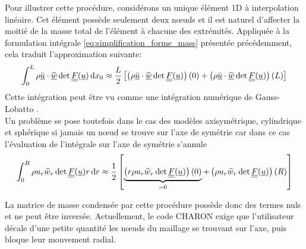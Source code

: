 \documentclass[10pt]{book}
\begin{document}
Pour illustrer cette procédure, considérons un unique élément 1D à interpolation linéaire. Cet élément possède seulement deux nœuds et il est naturel d'affecter la moitié de la masse total de l’élément à chacune des extrémités. Appliquée à la formulation intégrale \eqref{eq:simplification_forme_mass} présentée précédemment, cela traduit l'approximation suivante:
$$\int_{0}^{L}\rho\ddot{\underline{u}}\cdot\widehat{\underline{w}}\det\underline{\underline{F}}(\underline{u})\,\mathrm{d}x_{0}\approx \dfrac{L}{2}\left[\left(\rho\ddot{\underline{u}}\cdot\widehat{\underline{w}}\det\underline{\underline{F}}(\underline{u})\right)(0)+\left(\rho\ddot{\underline{u}}\cdot\widehat{\underline{w}}\det\underline{\underline{F}}(\underline{u})\right)(L)\right]$$
Cette intégration peut être vu comme une intégration numérique de Gauss-Lobatto \cite{durufle2009influence, teukolsky2015short}.\\

Un problème se pose toutefois dans le cas des modèles axisymétrique, cylindrique et sphérique si jamais un nœud se trouve sur l'axe de symétrie car dans ce cas l'évaluation de l'intégrale sur l'axe de symétrie s'annule
$$\int_{0}^{R}\rho u_{r}\widehat{w}_{r}\det\underline{\underline{F}}(\underline{u})r\,\mathrm{d}r\approx \dfrac{1}{2}\left[\underbrace{\left(r\rho u_{r}\widehat{w}_{r}\det\underline{\underline{F}}(\underline{u})\right)(0)}_{=0}+\left(\rho u_{r}\widehat{w}_{r}\det\underline{\underline{F}}(\underline{u})\right)(R)\right]$$
\begin{Rem}{\label{Rem:erreur_matrice_condensee}La matrice de masse condensée par cette procédure possède donc des termes nuls et ne peut être inversée. Actuellement, le code CHARON exige que l'utilisateur décale d'une petite quantité les nœuds du maillage se trouvant sur l'axe, puis bloque leur mouvement radial.}\end{Rem}
\end{document}
